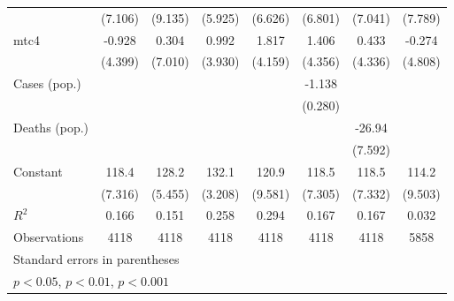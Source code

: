 \documentclass{article}
\begin{document}
{\begin{longtable}{l*{7}{c}}
                &  (7.106)         &  (9.135)         &  (5.925)         &  (6.626)         &  (6.801)         &  (7.041)         &  (7.789)         \\
mtc4            &   -0.928         &    0.304         &    0.992         &    1.817         &    1.406         &    0.433         &   -0.274         \\
                &  (4.399)         &  (7.010)         &  (3.930)         &  (4.159)         &  (4.356)         &  (4.336)         &  (4.808)         \\
Cases (pop.)    &                  &                  &                  &                  &   -1.138\sym{***}&                  &                  \\
                &                  &                  &                  &                  &  (0.280)         &                  &                  \\
Deaths (pop.)   &                  &                  &                  &                  &                  &   -26.94\sym{**} &                  \\
                &                  &                  &                  &                  &                  &  (7.592)         &                  \\
Constant        &    118.4\sym{***}&    128.2\sym{***}&    132.1\sym{***}&    120.9\sym{***}&    118.5\sym{***}&    118.5\sym{***}&    114.2\sym{***}\\
                &  (7.316)         &  (5.455)         &  (3.208)         &  (9.581)         &  (7.305)         &  (7.332)         &  (9.503)         \\
\hline
\(R^{2}\)       &    0.166         &    0.151         &    0.258         &    0.294         &    0.167         &    0.167         &    0.032         \\
Observations    &     4118         &     4118         &     4118         &     4118         &     4118         &     4118         &     5858         \\
\hline\hline
\multicolumn{8}{l}{\footnotesize Standard errors in parentheses}\\
\multicolumn{8}{l}{\footnotesize \sym{*} \(p<0.05\), \sym{**} \(p<0.01\), \sym{***} \(p<0.001\)}\\
\end{longtable}
}
\end{document}
